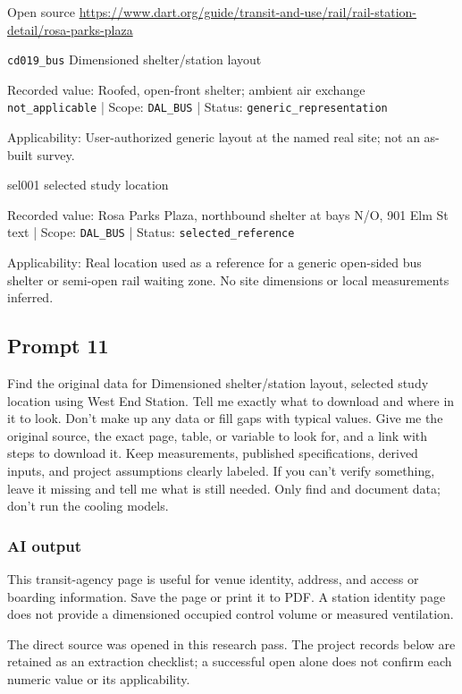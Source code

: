 Open source  \url{https://www.dart.org/guide/transit-and-use/rail/rail-station-detail/rosa-parks-plaza}

\nolinkurl{cd019_bus}  Dimensioned shelter/station layout

Recorded value: Roofed, open-front shelter; ambient air exchange \nolinkurl{not_applicable} | Scope: \nolinkurl{DAL_BUS} | Status: \nolinkurl{generic_representation}

Applicability: User-authorized generic layout at the named real site; not an as-built survey.

sel001  selected study location

Recorded value: Rosa Parks Plaza, northbound shelter at bays N/O, 901 Elm St text | Scope: \nolinkurl{DAL_BUS} | Status: \nolinkurl{selected_reference}

Applicability: Real location used as a reference for a generic open-sided bus shelter or semi-open rail waiting zone. No site dimensions or local measurements inferred.

\subsection*{Prompt 11}
Find the original data for Dimensioned shelter/station layout, selected study location using West End Station. Tell me exactly what to download and where in it to look. Don’t make up any data or fill gaps with typical values. Give me the original source, the exact page, table, or variable to look for, and a link with steps to download it. Keep measurements, published specifications, derived inputs, and project assumptions clearly labeled. If you can’t verify something, leave it missing and tell me what is still needed. Only find and document data; don’t run the cooling models.

\subsubsection*{AI output}
This transit-agency page is useful for venue identity, address, and access or boarding information. Save the page or print it to PDF. A station identity page does not provide a dimensioned occupied control volume or measured ventilation.

The direct source was opened in this research pass. The project records below are retained as an extraction checklist; a successful open alone does not confirm each numeric value or its applicability.

